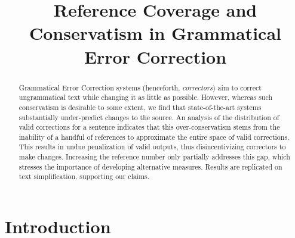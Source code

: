 \documentclass[letterpaper, 11pt]{article}
\begin{document}
\title{Reference Coverage and Conservatism in Grammatical Error Correction}
\maketitle

\begin{abstract}
  Grammatical Error Correction systems (henceforth, {\it correctors}) aim to
  correct ungrammatical text while changing it as little as possible.
  However, whereas such conservatism is desirable to some extent,
  we find that state-of-the-art systems substantially under-predict
  changes to the source. 
  An analysis of the distribution of valid corrections for a sentence
  indicates that this over-conservatism stems from
  the inability of a handful of references to approximate the entire
  space of valid
  corrections. This results in undue penalization of valid outputs,
  thus disincentivizing correctors to make changes.
  Increasing the reference number only partially addresses this gap,
  which stresses the importance of developing alternative measures.
  Results are replicated on text simplification, supporting our claims.
\end{abstract}

\section{Introduction}
\end{document}
